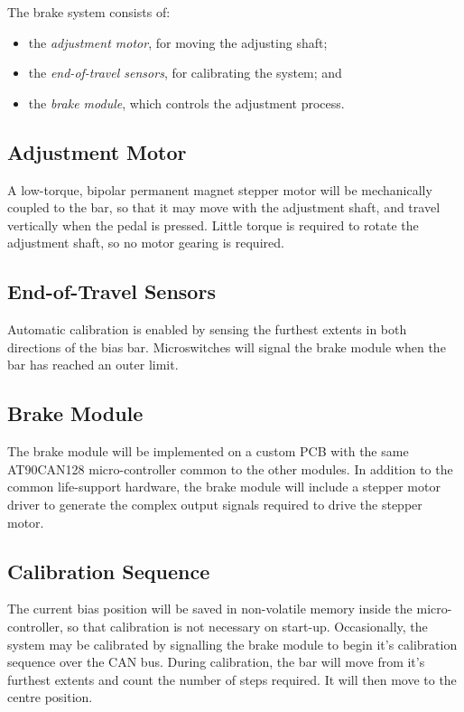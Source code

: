 The brake system consists of: 

\begin{itemize}
\item the \emph{adjustment motor}, for moving the adjusting shaft;
\item the \emph{end-of-travel sensors}, for calibrating the system; and
\item the \emph{brake module}, which controls the adjustment process.
\end{itemize}

\subsection{Adjustment Motor}

A low-torque, bipolar permanent magnet stepper motor will be mechanically coupled to the bar, so that it may move with the adjustment shaft, and travel vertically when the pedal is pressed. Little torque is required to rotate the adjustment shaft, so no motor gearing is required. 

\subsection{End-of-Travel Sensors}

Automatic calibration is enabled by sensing the furthest extents in both directions of the bias bar. Microswitches will signal the brake module when the bar has reached an outer limit. 

\subsection{Brake Module}

The brake module will be implemented on a custom PCB with the same AT90CAN128 micro-controller common to the other modules. In addition to the common life-support hardware, the brake module will include a stepper motor driver to generate the complex output signals required to drive the stepper motor.

\subsection{Calibration Sequence}

The current bias position will be saved in non-volatile memory inside the micro-controller, so that calibration is not necessary on start-up. Occasionally, the system may be calibrated by signalling the brake module to begin it's calibration sequence over the CAN bus. During calibration, the bar will move from it's furthest extents and count the number of steps required. It will then move to the centre position.

